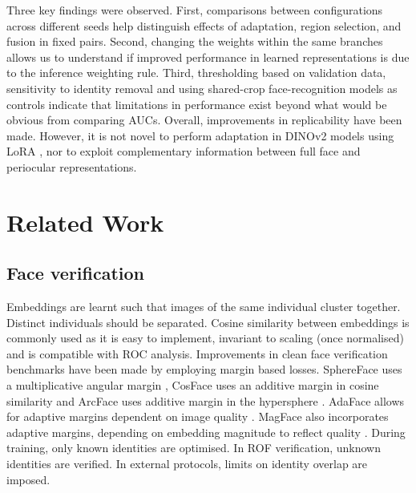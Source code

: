 \documentclass[10pt,lettersize,journal]{IEEEtran}
\begin{document}
Three key findings were observed. First, comparisons between configurations across different seeds help distinguish effects of adaptation, region selection, and fusion in fixed pairs. Second, changing the weights within the same branches allows us to understand if improved performance in learned representations is due to the inference weighting rule. Third, thresholding based on validation data, sensitivity to identity removal and using shared-crop face-recognition models as controls indicate that limitations in performance exist beyond what would be obvious from comparing AUCs. Overall, improvements in replicability have been made. However, it is not novel to perform adaptation in DINOv2 models \cite{dinov2} using LoRA \cite{lora}, nor to exploit complementary information between full face and periocular representations.\par
\section{Related Work}
\subsection{Face verification}
Embeddings are learnt such that images of the same individual cluster together. Distinct individuals should be separated. Cosine similarity between embeddings is commonly used as it is easy to implement, invariant to scaling (once normalised) and is compatible with ROC analysis. Improvements in clean face verification benchmarks have been made by employing margin based losses. SphereFace uses a multiplicative angular margin \cite{sphereface}, CosFace uses an additive margin in cosine similarity \cite{cosface} and ArcFace uses additive margin in the hypersphere \cite{arcface}. AdaFace allows for adaptive margins dependent on image quality \cite{adaface}. MagFace also incorporates adaptive margins, depending on embedding magnitude to reflect quality \cite{magface}. During training, only known identities are optimised. In ROF verification, unknown identities are verified. In external protocols, limits on identity overlap are imposed.\par
\end{document}
